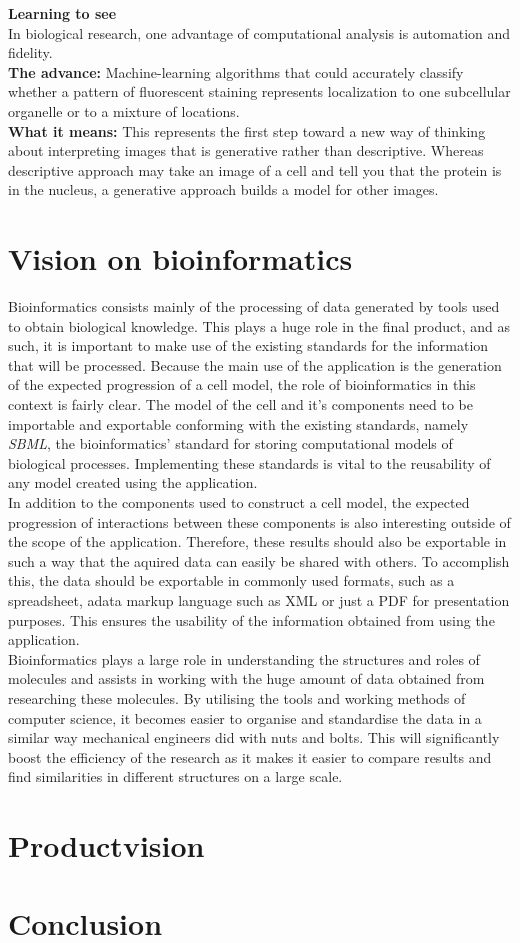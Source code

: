 \documentclass[10pt,a4paper]{report}
\begin{document}
	\textbf{Learning to see}\\
	In biological research, one advantage of computational analysis is automation and fidelity.\\
	\textbf{The advance:} Machine-learning algorithms that could accurately classify whether a pattern of fluorescent staining represents localization to one subcellular organelle or to a mixture of locations.\\
	\textbf{What it means:} This represents the first step toward a new way of thinking about interpreting images that is generative rather than descriptive.
	Whereas descriptive approach may take an image of a cell and tell you that the protein is in the nucleus, a generative approach builds a model for other images.
	
	\newpage
	\section{Vision on bioinformatics}
		Bioinformatics consists mainly of the processing of data generated by tools used to obtain biological knowledge. This plays a huge role in the final product, and as such, it is important to make use of the existing standards for the information that will be processed. Because the main use of the application is the generation of the expected progression of a cell model, the role of bioinformatics in this context is fairly clear. The model of the cell and it's components need to be importable and exportable conforming with the existing standards, namely \emph{SBML}, the bioinformatics' standard for storing computational models of biological processes. Implementing these standards is vital to the reusability of any model created using the application. \\
		In addition to the components used to construct a cell model, the expected progression of interactions between these components is also interesting outside of the scope of the application. Therefore, these results should also be exportable in such a way that the aquired data can easily be shared with others. To accomplish this, the data should be exportable in commonly used formats, such as a spreadsheet, adata markup language such as XML or just a PDF for presentation purposes. This ensures the usability of the information obtained from using the application.\\
		Bioinformatics plays a large role in understanding the structures and roles of molecules and assists in working with the huge amount of data obtained from researching these molecules. By utilising the tools and working methods of computer science, it becomes easier to organise and standardise the data in a similar way mechanical engineers did with nuts and bolts. This will significantly boost the efficiency of the research as it makes it easier to compare results and find similarities in different structures on a large scale.
	
	\section{Productvision}
	
	\section{Conclusion}
	
	
\end{document}
